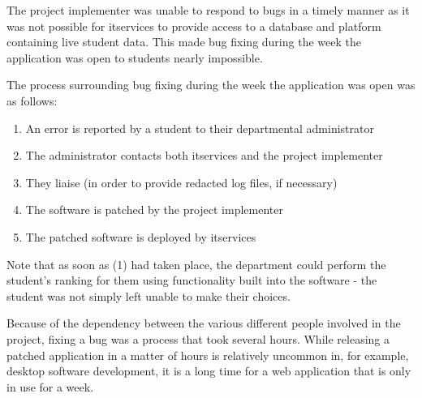 \documentclass[draft]{scrartcl}
\begin{document}



The project implementer was unable to respond to bugs in a timely manner as
it was not possible for \gls{itservices} to provide access to a database and
platform containing live student data. This made bug fixing during the week
the application was open to students nearly impossible.

The process surrounding bug fixing during the week the application was open
was as follows:

\begin{enumerate}
  \item An error is reported by a student to their departmental administrator
  \item The administrator contacts both \gls{itservices} and the project implementer
  \item They liaise (in order to provide redacted log files, if necessary)
  \item The software is patched by the project implementer
  \item The patched software is deployed by \gls{itservices}
\end{enumerate}

Note that as soon as (1) had taken place, the department could perform the
student's ranking for them using functionality built into the software - the
student was not simply left unable to make their choices.

Because of the dependency between the various different people involved in the
project, fixing a bug was a process that took several hours. While releasing a
patched application in a matter of hours is relatively uncommon in, for
example, desktop software development, it is a long time for a web application
that is only in use for a week.
\end{document}
